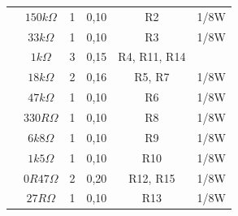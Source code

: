 \documentclass[a4paper,12pt,oneside,openany,table,xcdraw]{article}
\begin{document}
\begin{table}[H]
{\begin{tabular}{cc|c|c|cc}
\multicolumn{1}{|c|}{}                              & $150k \Omega$          & 1                   & 0,10           & \multicolumn{1}{c|}{R2}                 & \multicolumn{1}{c|}{1/8W}                          \\ \cline{2-6} 
\multicolumn{1}{|c|}{}                              & $33k \Omega$           & 1                   & 0,10           & \multicolumn{1}{c|}{R3}                 & \multicolumn{1}{c|}{1/8W}                          \\ \cline{2-6} 
\multicolumn{1}{|c|}{}                              & $1k \Omega$            & 3                   & 0,15           & \multicolumn{1}{c|}{R4, R11, R14}       & \multicolumn{1}{c|}{}                              \\ \cline{2-6} 
\multicolumn{1}{|c|}{}                              & $18k \Omega$           & 2                   & 0,16           & \multicolumn{1}{c|}{R5, R7}             & \multicolumn{1}{c|}{1/8W}                          \\ \cline{2-6} 
\multicolumn{1}{|c|}{}                              & $47k \Omega$           & 1                   & 0,10           & \multicolumn{1}{c|}{R6}                 & \multicolumn{1}{c|}{1/8W}                          \\ \cline{2-6} 
\multicolumn{1}{|c|}{}                              & $330R \Omega$          & 1                   & 0,10           & \multicolumn{1}{c|}{R8}                 & \multicolumn{1}{c|}{1/8W}                          \\ \cline{2-6} 
\multicolumn{1}{|c|}{}                              & $6k8 \Omega$           & 1                   & 0,10           & \multicolumn{1}{c|}{R9}                 & \multicolumn{1}{c|}{1/8W}                          \\ \cline{2-6} 
\multicolumn{1}{|c|}{}                              & $1k5 \Omega$           & 1                   & 0,10           & \multicolumn{1}{c|}{R10}                & \multicolumn{1}{c|}{1/8W}                          \\ \cline{2-6} 
\multicolumn{1}{|c|}{}                              & $0R47 \Omega$          & 2                   & 0,20           & \multicolumn{1}{c|}{R12, R15}           & \multicolumn{1}{c|}{1/8W}                          \\ \cline{2-6} 
\multicolumn{1}{|c|}{}                              & $27R \Omega$           & 1                   & 0,10           & \multicolumn{1}{c|}{R13}                & \multicolumn{1}{c|}{1/8W}                          \\ \cline{2-6} 

\end{tabular}}
\end{table}
\end{document}
